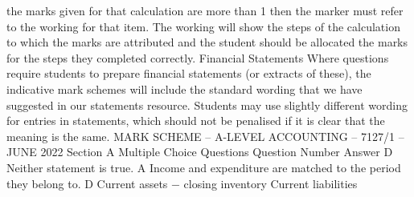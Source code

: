 \documentclass{article}
\begin{document}
the marks given for that calculation are more than 1 then the marker must refer to the working for that \newline
item.  The working will show the steps of the calculation to which the marks are attributed and the \newline
student should be allocated the marks for the steps they completed correctly. \newline
 \newline
Financial Statements \newline
 \newline
Where questions require students to prepare financial statements (or extracts of these), the indicative \newline
mark schemes will include the standard wording that we have suggested in our statements resource. \newline
Students may use slightly different wording for entries in statements, which should not be penalised if it \newline
is clear that the meaning is the same. \newline
 \newline
 \newline
 \newline
MARK SCHEME – A-LEVEL ACCOUNTING – 7127/1 – JUNE 2022  \newline
Section A \newline
 \newline
Multiple Choice Questions \newline
 \newline
Question \newline
Number \newline
Answer  \newline
D \newline
Neither statement is true.  \newline
A \newline
Income and expenditure are matched to the period they belong to.  \newline
D \newline
Current assets − closing inventory\newline
 Current liabilities \newline
  \newline
\end{document}
